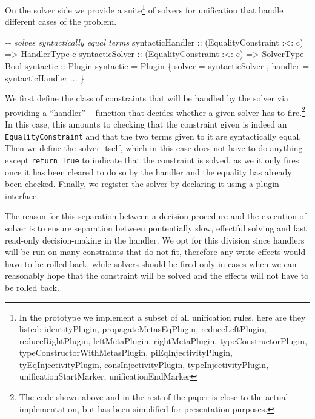 \documentclass[
  sigconf,
  screen,
  review]{acmart}
\newenvironment{Shaded}{}{}
\newcommand{\CommentTok}[1]{\textcolor[rgb]{0.38,0.63,0.69}{\textit{#1}}}
\newcommand{\DataTypeTok}[1]{\textcolor[rgb]{0.56,0.13,0.00}{#1}}
\newcommand{\NormalTok}[1]{#1}
\newcommand{\OperatorTok}[1]{\textcolor[rgb]{0.40,0.40,0.40}{#1}}
\newcommand{\OtherTok}[1]{\textcolor[rgb]{0.00,0.44,0.13}{#1}}
\begin{document}
On the solver side we provide a suite\footnote{In the prototype we
  implement a subset of all unification rules, here are they listed:
  identityPlugin, propagateMetasEqPlugin, reduceLeftPlugin,
  reduceRightPlugin, leftMetaPlugin, rightMetaPlugin,
  typeConstructorPlugin, typeConstructorWithMetasPlugin,
  piEqInjectivityPlugin, tyEqInjectivityPlugin, consInjectivityPlugin,
  typeInjectivityPlugin, unificationStartMarker, unificationEndMarker}
of solvers for unification that handle different cases of the problem.

\begin{Shaded}
\begin{Highlighting}[]
\CommentTok{{-}{-} solves syntactically equal terms}
\OtherTok{syntacticHandler ::}\NormalTok{ (}\DataTypeTok{EqualityConstraint} \OperatorTok{:\textless{}:}\NormalTok{ c)}
                 \OtherTok{=\textgreater{}} \DataTypeTok{HandlerType}\NormalTok{ c}
\OtherTok{syntacticSolver ::}\NormalTok{ (}\DataTypeTok{EqualityConstraint} \OperatorTok{:\textless{}:}\NormalTok{ c)}
                \OtherTok{=\textgreater{}} \DataTypeTok{SolverType} \DataTypeTok{Bool}
\OtherTok{syntactic ::} \DataTypeTok{Plugin}
\NormalTok{syntactic  }\OtherTok{=} \DataTypeTok{Plugin}\NormalTok{ \{ solver  }\OtherTok{=}\NormalTok{ syntacticSolver}
\NormalTok{                    , handler }\OtherTok{=}\NormalTok{ syntacticHandler}
                    \OperatorTok{...}
\NormalTok{                    \}}
\end{Highlighting}
\end{Shaded}

We first define the class of constraints that will be handled by the
solver via providing a ``handler'' -- function that decides whether a
given solver has to fire.\footnote{The code shown above and in the rest
  of the paper is close to the actual implementation, but has been
  simplified for presentation purposes.} In this case, this amounts to
checking that the constraint given is indeed an
\texttt{EqualityConstraint} and that the two terms given to it are
syntactically equal. Then we define the solver itself, which in this
case does not have to do anything except \texttt{return\ True} to
indicate that the constraint is solved, as we it only fires once it has
been cleared to do so by the handler and the equality has already been
checked. Finally, we register the solver by declaring it using a plugin
interface.

The reason for this separation between a decision procedure and the
execution of solver is to ensure separation between pontentially slow,
effectful solving and fast read-only decision-making in the handler. We
opt for this division since handlers will be run on many constraints
that do not fit, therefore any write effects would have to be rolled
back, while solvers should be fired only in cases when we can reasonably
hope that the constraint will be solved and the effects will not have to
be rolled back.
\end{document}

